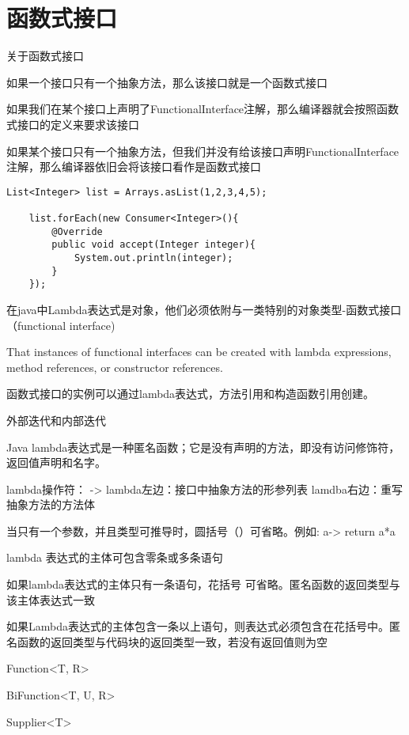 \chapter{函数式接口}
\label{chap:functional}


关于函数式接口

如果一个接口只有一个抽象方法，那么该接口就是一个函数式接口

如果我们在某个接口上声明了FunctionalInterface注解，那么编译器就会按照函数式接口的定义来要求该接口

如果某个接口只有一个抽象方法，但我们并没有给该接口声明FunctionalInterface注解，那么编译器依旧会将该接口看作是函数式接口

\begin{lstlisting}[style=cjava]
    List<Integer> list = Arrays.asList(1,2,3,4,5);

    list.forEach(new Consumer<Integer>(){
        @Override
        public void accept(Integer integer){
            System.out.println(integer);
        }
    });
\end{lstlisting}

在java中Lambda表达式是对象，他们必须依附与一类特别的对象类型-函数式接口（functional interface)

That instances of functional interfaces can be created with lambda expressions, method references, or constructor references.

函数式接口的实例可以通过lambda表达式，方法引用和构造函数引用创建。


外部迭代和内部迭代

Java lambda表达式是一种匿名函数；它是没有声明的方法，即没有访问修饰符，返回值声明和名字。

lambda操作符： ->
lambda左边：接口中抽象方法的形参列表
lamdba右边：重写抽象方法的方法体


当只有一个参数，并且类型可推导时，圆括号（）可省略。例如: a-> return a*a

lambda 表达式的主体可包含零条或多条语句

如果lambda表达式的主体只有一条语句，花括号{} 可省略。匿名函数的返回类型与该主体表达式一致

如果Lambda表达式的主体包含一条以上语句，则表达式必须包含在花括号{}中。匿名函数的返回类型与代码块的返回类型一致，若没有返回值则为空



Function<T, R>
 
BiFunction<T, U, R>

Supplier<T>


